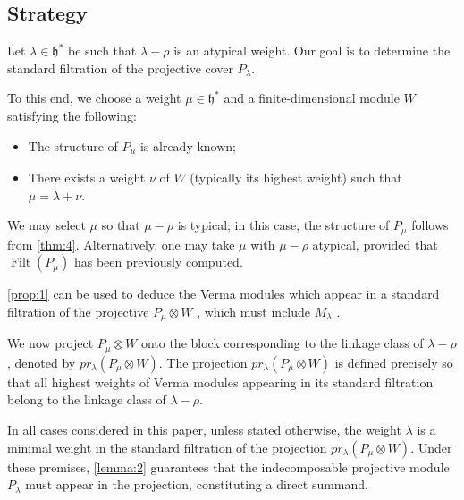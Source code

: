 \subsection{Strategy}
Let $\lambda \in \mathfrak{h}^* $ be such that $\lambda - \rho$ is an atypical weight. Our goal is to determine the standard filtration of the projective cover $P_\lambda$.

To this end, we choose a weight $ \mu \in \mathfrak{h}^* $ and a finite-dimensional module  $W$  satisfying the following:
\begin{itemize}
    \item The structure of $P_\mu$ is already known;
    \item There exists a weight $\nu$ of $W$ (typically its highest weight) such that $\mu = \lambda + \nu$.
\end{itemize}

We may select $\mu$ so that $\mu - \rho$ is typical; in this case, the structure of $ P_\mu $ follows from \cref{thm:4}. Alternatively, one may take $\mu$ with $\mu - \rho$ atypical, provided that $\operatorname{Filt}(P_\mu)$ has been previously computed.

\cref{prop:1} can be used to deduce the Verma modules which appear in a standard filtration of the projective  $ P_\mu \otimes W $ , which must include  $ M_\lambda $ .

We now project $P_\mu \otimes W$ onto the block corresponding to the linkage class of $\lambda - \rho$, denoted by $pr_\lambda(P_\mu \otimes W)$. The projection $pr_\lambda(P_\mu \otimes W)$ is defined precisely so that all highest weights of Verma modules appearing in its standard filtration belong to the linkage class of $\lambda - \rho$.

In all cases considered in this paper, unless stated otherwise, the weight $\lambda$ is a minimal weight in the standard filtration of the projection $pr_\lambda(P_\mu \otimes W)$. Under these premises, \cref{lemma:2} guarantees that the indecomposable projective module $P_\lambda$ must appear in the projection, constituting a direct summand.

